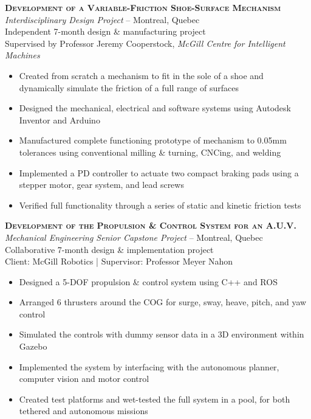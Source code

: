 \documentclass[12pt, letterpaper]{article}
\newcommand{\years}[1]{\marginnote{\footnotesize #1}} %
\begin{document}
	\begin{samepage}
		\years{9/2013 - 7/2014} \textbf{\scshape Development of a Variable-Friction Shoe-Surface Mechanism}\\
		{\textit{Interdisciplinary Design Project}} -- Montreal, Quebec\\
		{\small Independent 7-month design \& manufacturing project}\\
		{\small Supervised by Professor Jeremy Cooperstock, \textsl {McGill Centre for Intelligent Machines}}
		\begin{itemize}
			\item Created from scratch a mechanism to fit in the sole of a shoe and dynamically simulate the friction of a full range of surfaces %
			\item Designed the mechanical, electrical and software systems using Autodesk Inventor and Arduino
			\item Manufactured complete functioning prototype of mechanism to 0.05mm tolerances using conventional milling \& turning, CNCing, and welding
			\item Implemented a PD controller to actuate two compact braking pads using a stepper motor, gear system, and lead screws
			\item Verified full functionality through a series of static and kinetic friction tests 
		\end{itemize}
	\end{samepage}
	\vspace{.1in}

\clearpage

	\begin{samepage}
		\years{9/2013 - 5/2014} \textbf{\scshape Development of the Propulsion \& Control System for an A.U.V.}\\
		{\textit{Mechanical Engineering Senior Capstone Project}} -- Montreal, Quebec\\
		{\small Collaborative 7-month design \& implementation project}\\
		{\small Client: McGill Robotics | Supervisor: Professor Meyer Nahon}
		\begin{itemize}
			\item Designed a 5-DOF propulsion \& control system using C++ and ROS
			\item Arranged 6 thrusters around the COG for surge, sway, heave, pitch, and yaw control
			\item Simulated the controls with dummy sensor data in a 3D environment within Gazebo 
			\item Implemented the system by interfacing with the autonomous planner, computer vision and motor control
			\item Created test platforms and wet-tested the full system in a pool, for both tethered and autonomous missions
		\end{itemize}
	\end{samepage}
	\vspace{.1in}
\end{document}
